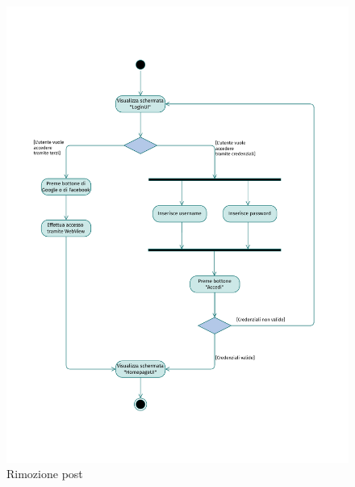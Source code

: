 \documentclass{natourDoc}
\begin{document}
	\newpage
	\begin{figure}[!htbp]
		\centering
		\includegraphics[width=\textwidth, page=5]{./diagrams/activity.pdf}
		\caption{Rimozione post}
	\end{figure}
	\FloatBarrier
\end{document}
